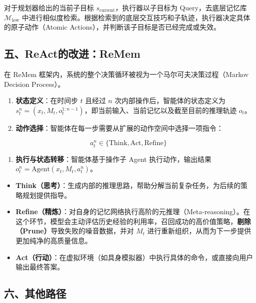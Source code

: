 对于规划器给出的当前子目标 \(s_{\mathrm{current}}\)，执行器以子目标为 Query，去底层记忆库 \(\mathcal{M}_{\mathrm{low}}\) 中进行相似度检索。根据检索到的底层交互技巧和子轨迹，执行器决定具体的原子动作（Atomic Actions），并判断该子目标是否已经完成或失效。

\hypertarget{ux4e94reactux7684ux6539ux8fdbremem}{%
\subsection{五、ReAct的改进：ReMem}\label{ux4e94reactux7684ux6539ux8fdbremem}}

在 ReMem 框架内，系统的整个决策循环被视为一个马尔可夫决策过程（Markov Decision Process）。

\begin{enumerate}
\def\labelenumi{\arabic{enumi}.}
\tightlist
\item
  \textbf{状态定义}：在时间步 \(t\) 且经过 \(n\) 次内部操作后，智能体的状态定义为 \(s_t^n=(x_t,M_t,o_t^{1:n-1})\)，即当前输入、当前记忆以及截至目前的推理轨迹 \(o_t\)。
\item
  \textbf{动作选择}：智能体在每一步需要从扩展的动作空间中选择一项指令：
\end{enumerate}

\[
a_t^n \in \{\mathrm{Think}, \mathrm{Act}, \mathrm{Refine}\}
\]

\begin{enumerate}
\def\labelenumi{\arabic{enumi}.}
\setcounter{enumi}{2}
\tightlist
\item
  \textbf{执行与状态转移}：智能体基于操作子 Agent 执行动作，输出结果 \(o_t^n=\mathrm{Agent}(x_t,M_t,a_t^n)\)。
\end{enumerate}

\begin{itemize}
\tightlist
\item
  \textbf{Think（思考）}：生成内部的推理思路，帮助分解当前复杂任务，为后续的策略规划提供指导。
\item
  \textbf{Refine（精炼）}：对自身的记忆网络执行高阶的元推理（Meta-reasoning）。在这个环节，模型会主动评估历史经验的利用率，召回成功的高价值策略，\textbf{剔除（Prune）}导致失败的噪音数据，并对 \(M_t\) 进行重新组织，从而为下一步提供更加纯净的高质量信息。
\item
  \textbf{Act（行动）}：在虚拟环境（如具身模拟器）中执行具体的命令，或直接向用户输出最终答案。
\end{itemize}

\hypertarget{ux516dux5176ux4ed6ux8defux5f84}{%
\subsection{六、其他路径}\label{ux516dux5176ux4ed6ux8defux5f84}}

